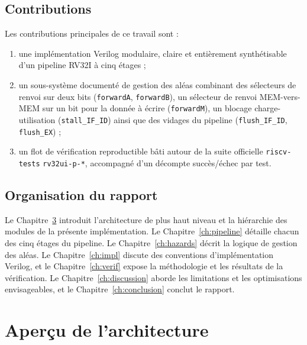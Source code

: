 \documentclass[11pt,a4paper,oneside]{report}
\begin{document}
\section{Contributions}
Les contributions principales de ce travail sont :
\begin{enumerate}
  \item une implémentation Verilog modulaire, claire et
        entièrement synthétisable d'un pipeline RV32I à cinq
        étages ;
  \item un sous-système documenté de gestion des aléas combinant
        des sélecteurs de renvoi sur deux bits (\texttt{forwardA},
        \texttt{forwardB}), un sélecteur de renvoi MEM-vers-MEM
        sur un bit pour la donnée à écrire (\texttt{forwardM}),
        un blocage charge-utilisation (\texttt{stall\_IF\_ID})
        ainsi que des vidages du pipeline (\texttt{flush\_IF\_ID},
        \texttt{flush\_EX}) ;
  \item un flot de vérification reproductible bâti autour de la
        suite officielle \texttt{riscv-tests}
        \texttt{rv32ui-p-*}, accompagné d'un décompte
        succès/échec par test.
\end{enumerate}

\section{Organisation du rapport}
Le Chapitre~\ref{ch:arch} introduit l'architecture de plus haut niveau et
la hiérarchie des modules de la présente implémentation. Le
Chapitre~\ref{ch:pipeline} détaille chacun des cinq étages du pipeline.
Le Chapitre~\ref{ch:hazards} décrit la logique de gestion des aléas. Le
Chapitre~\ref{ch:impl} discute des conventions d'implémentation Verilog,
et le Chapitre~\ref{ch:verif} expose la méthodologie et les résultats de
la vérification. Le Chapitre~\ref{ch:discussion} aborde les limitations
et les optimisations envisageables, et le Chapitre~\ref{ch:conclusion}
conclut le rapport.


\chapter{Aperçu de l'architecture}
\label{ch:arch}
\end{document}
